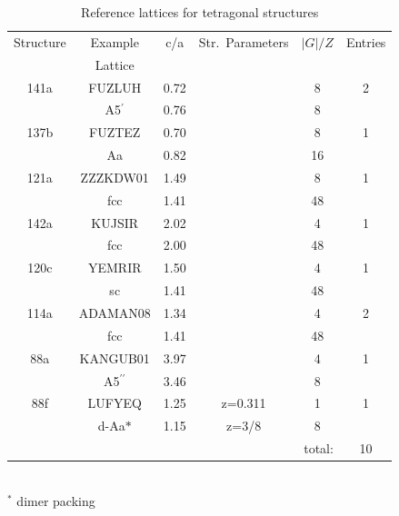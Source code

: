 \documentclass[preprint]{iucr}              %
\begin{document}
\begin{table}
\caption{Reference lattices for tetragonal structures} \label{tet}
\begin{center}
\begin{tabular}{cccccc}%
\cline{1-6}
Structure & Example & c/a & Str.\ Parameters & $|G|/Z$ & Entries \\
          & Lattice \\
\cline{1-6}
141a    & FUZLUH    & 0.72 & & 8 & 2 \\
        & A5$^\prime$&0.76 & & 8 \\
137b    & FUZTEZ    & 0.70 & & 8 & 1 \\
        & Aa        & 0.82 & & 16 \\
121a    & ZZZKDW01  & 1.49 & & 8 & 1 \\
        & fcc       & 1.41 & & 48 \\
142a    & KUJSIR    & 2.02 & & 4 & 1 \\
        & fcc       & 2.00 & & 48 \\
120c    & YEMRIR    & 1.50 & & 4 & 1 \\
        & sc        & 1.41 & & 48 \\
114a    & ADAMAN08  & 1.34 & & 4 & 2 \\
        & fcc       & 1.41 & & 48 \\
88a     & KANGUB01  & 3.97 & & 4 & 1 \\
        & A5$^{\prime\prime}$& 3.46&&8 \\
88f     & LUFYEQ    & 1.25 & z=0.311&1&1 \\
        & d-Aa$*$     & 1.15 & z=3/8&8 \\
\cline{6-6}
\multicolumn{5}{r}{total:} & 10 \\
\cline{1-6}
\end{tabular} \\
$^*$ dimer packing
\end{center}
\end{table}
\end{document}
